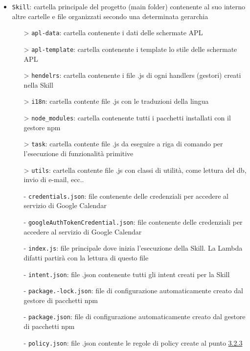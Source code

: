 \begin{itemize}
        \item \texttt{Skill}: cartella principale del progetto (main folder) contenente al suo interno altre cartelle e file organizzati secondo una determinata gerarchia
        \begin{itemize}
            \item[>] \texttt{apl-data}: cartella contenente i dati delle schermate APL
            \item[>] \texttt{apl-template}: cartella contenente i template lo stile delle schermate APL
            \item[>] \texttt{hendelrs}: cartella contenente i file .js di ogni handlers (gestori) creati nella Skill
            \item[>] \texttt{i18n}: cartella contente file .js con le traduzioni della lingua 
            \item[>] \texttt{node\_modules}: cartella contenente tutti i pacchetti installati con il gestore npm
            \item[>] \texttt{task}: cartella contente file .js da eseguire a riga di comando per l'esecuzione di funzionalità primitive 
            \item[>] \texttt{utils}: cartella contente file .js con classi di utilità, come lettura del db, invio di e-mail, ecc..
            \item[-] \texttt{credentials.json}: file contenente delle credenziali per accedere al servizio di Google Calendar
            \item[-] \texttt{googleAuthTokenCredential.json}: file contenente delle credenziali per accedere al servizio di Google Calendar
            \item[-] \texttt{index.js}: file principale dove inizia l'esecuzione della Skill. La Lambda difatti partirà con la lettura di questo file
            \item[-] \texttt{intent.json}: file .json contenente tutti gli intent creati per la Skill
            \item[-] \texttt{package.-lock.json}: file di configurazione automaticamente creato dal gestore di pacchetti npm
            \item[-] \texttt{package.json}: file di configurazione automaticamente creato dal gestore di pacchetti npm
            \item[-] \texttt{policy.json}: file .json contente le regole di policy create al punto \hyperref[aws-iam]{3.2.3}
        \end{itemize}
    \end{itemize}
